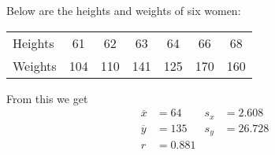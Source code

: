 \documentclass[../mathNotesPreamble]{subfiles}
\begin{document}
    \begin{ex*}
      Below are the heights and weights of six women:
        \begin{center}
          \begin{tabular}{@{}l*{6}{c}@{}}\toprule
            Heights& 61& 62& 63& 64& 66& 68\\
            Weights& 104& 110& 141& 125& 170& 160\\\bottomrule
          \end{tabular}
        \end{center}
      From this we get 
        \begin{align*}
          \overline{x}&=64 & s_x&=2.608 \\
          \overline{y}&=135 & s_y&=26.728 \\
          r&=0.881
        \end{align*}
    \end{ex*}
    
\end{document}
